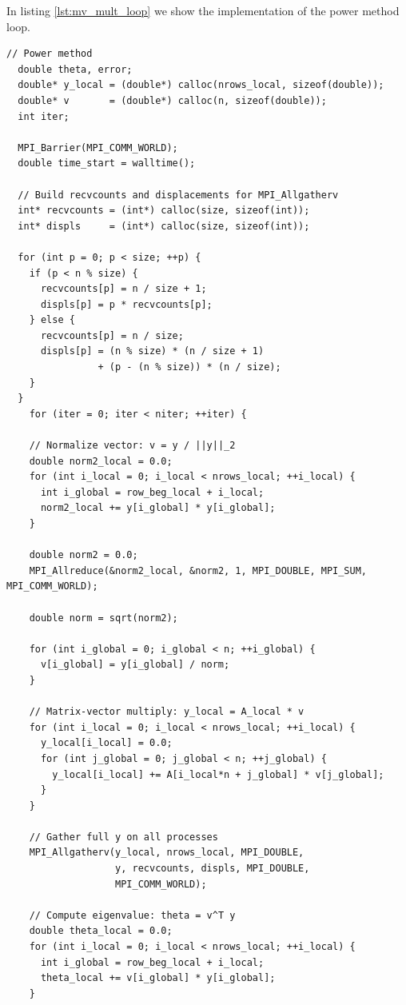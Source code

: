 \documentclass[unicode,10pt,a4paper,oneside,numbers=endperiod,openany]{scrartcl}
\begin{document}
In listing \ref{lst:mv_mult_loop} we show the implementation of the power method loop.
\begin{lstlisting}[style=grayverbatim, caption={Power method loop for parallel matrix-vector multiplication}, label={lst:mv_mult_loop}]
    // Power method
  double theta, error;
  double* y_local = (double*) calloc(nrows_local, sizeof(double));
  double* v       = (double*) calloc(n, sizeof(double));
  int iter;

  MPI_Barrier(MPI_COMM_WORLD);
  double time_start = walltime();

  // Build recvcounts and displacements for MPI_Allgatherv
  int* recvcounts = (int*) calloc(size, sizeof(int));
  int* displs     = (int*) calloc(size, sizeof(int));

  for (int p = 0; p < size; ++p) {
    if (p < n % size) {
      recvcounts[p] = n / size + 1;
      displs[p] = p * recvcounts[p];
    } else {
      recvcounts[p] = n / size;
      displs[p] = (n % size) * (n / size + 1)
                + (p - (n % size)) * (n / size);
    }
  }
    for (iter = 0; iter < niter; ++iter) {

    // Normalize vector: v = y / ||y||_2
    double norm2_local = 0.0;
    for (int i_local = 0; i_local < nrows_local; ++i_local) {
      int i_global = row_beg_local + i_local;
      norm2_local += y[i_global] * y[i_global];
    }

    double norm2 = 0.0;
    MPI_Allreduce(&norm2_local, &norm2, 1, MPI_DOUBLE, MPI_SUM, MPI_COMM_WORLD);

    double norm = sqrt(norm2);

    for (int i_global = 0; i_global < n; ++i_global) {
      v[i_global] = y[i_global] / norm;
    }

    // Matrix-vector multiply: y_local = A_local * v
    for (int i_local = 0; i_local < nrows_local; ++i_local) {
      y_local[i_local] = 0.0;
      for (int j_global = 0; j_global < n; ++j_global) {
        y_local[i_local] += A[i_local*n + j_global] * v[j_global];
      }
    }

    // Gather full y on all processes
    MPI_Allgatherv(y_local, nrows_local, MPI_DOUBLE,
                   y, recvcounts, displs, MPI_DOUBLE,
                   MPI_COMM_WORLD);

    // Compute eigenvalue: theta = v^T y
    double theta_local = 0.0;
    for (int i_local = 0; i_local < nrows_local; ++i_local) {
      int i_global = row_beg_local + i_local;
      theta_local += v[i_global] * y[i_global];
    }


\end{lstlisting}
\end{document}
